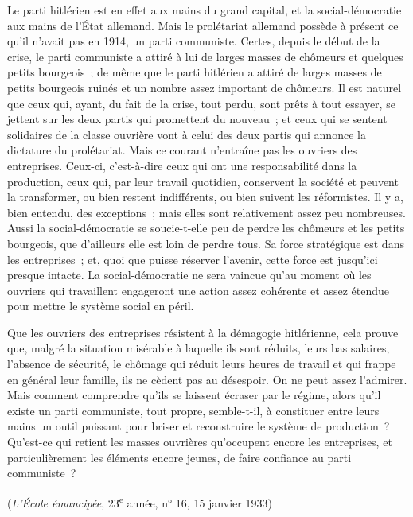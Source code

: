 \documentclass[french,twoside]{book} %
\begin{document}
Le parti hitlérien est en effet aux mains du grand capital, et la social-démocratie aux mains de l'État allemand. Mais le prolétariat allemand possède à présent ce qu'il n'avait pas en 1914, un parti communiste. Certes, depuis le début de la crise, le parti communiste a attiré à lui de larges masses de chô­meurs et quelques petits bourgeois ; de même que le parti hitlérien a attiré de larges masses de petits bourgeois ruinés et un nombre assez important de chômeurs. Il est naturel que ceux qui, ayant, du fait de la crise, tout perdu, sont prêts à tout essayer, se jettent sur les deux partis qui promettent du nouveau ; et ceux qui se sentent solidaires de la classe ouvrière vont à celui des deux partis qui annonce la dictature du prolétariat. Mais ce courant n'entraîne pas les ouvriers des entreprises. Ceux-ci, c'est-à-dire ceux qui ont une responsabilité dans la production, ceux qui, par leur travail quotidien, conservent la société et peuvent la transformer, ou bien restent indifférents, ou bien suivent les réformistes. Il y a, bien entendu, des exceptions ; mais elles sont relativement assez peu nombreuses. Aussi la social-démocratie se soucie-t-elle peu de perdre les chômeurs et les petits bourgeois, que d'ailleurs elle est loin de perdre tous. Sa force stratégique est dans les entreprises ; et, quoi que puisse réserver l'avenir, cette force est jusqu'ici presque intacte. La social-démocratie ne sera vaincue qu'au moment où les ouvriers qui travaillent engageront une action assez cohérente et assez étendue pour mettre le système social en péril.\par
Que les ouvriers des entreprises résistent à la démagogie hitlérienne, cela prouve que, malgré la situation misérable à laquelle ils sont réduits, leurs bas salaires, l'absence de sécurité, le chômage qui réduit leurs heures de travail et qui frappe en général leur famille, ils ne cèdent pas au désespoir. On ne peut assez l'admirer. Mais comment comprendre qu'ils se laissent écraser par le régime, alors qu'il existe un parti communiste, tout propre, semble-t-il, à constituer entre leurs mains un outil puissant pour briser et reconstruire le système de production ? Qu'est-ce qui retient les masses ouvrières qu'occupent encore les entreprises, et particulièrement les éléments encore jeunes, de faire confiance au parti communiste ?\par
({\itshape L'École émancipée}, 23\textsuperscript{e} année, n° 16, 15 janvier 1933)
\end{document}
